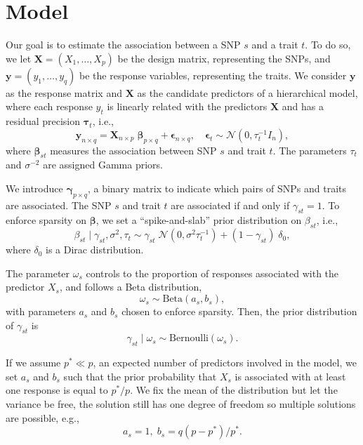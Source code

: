 \documentclass[a4paper, 11pt]{report}
\numberwithin{equation}{chapter}
\begin{document}
\chapter{Model}
Our goal is to estimate the association between a SNP $s$ and a trait $t$. To do so, we let $\boldsymbol{X }= (X_1,\ldots,X_p)$ be the design matrix, representing the SNPs, and $\boldsymbol{y} = (y_1,\ldots,y_q)$ be the response variables, representing the traits. We consider $\boldsymbol{y}$ as the response matrix and $\boldsymbol{X}$ as the candidate predictors of a hierarchical model, where each response $y_t$ is linearly related with the predictors $\boldsymbol{X}$ and has a residual precision $\boldsymbol{\tau}_t$, i.e.,
\begin{equation*}
\label{eq:model}
\boldsymbol{y}_{n\times q} = \boldsymbol{X}_{n \times p}\;\boldsymbol{\beta}_{p \times q}+\boldsymbol{\epsilon}_{n \times q},\quad\boldsymbol{\epsilon}_t \sim \mathcal{N}(0,\tau_t^{-1}I_n),
\end{equation*}
where $\boldsymbol{\beta}_{st}$ measures the association between SNP $s$ and trait $t$. The parameters $\tau_t$ and $\sigma^{-2}$ are assigned Gamma priors.

We introduce $\boldsymbol{\gamma}_{p\times q}$, a binary matrix to indicate which pairs of SNPs and traits are associated. The SNP $s$ and trait $t$ are associated if and only if $\gamma_{st} = 1$. To enforce sparsity on $\boldsymbol{\beta}$, we set a ``spike-and-slab'' prior distribution on $\beta_{st}$, i.e.,
\begin{equation*}
\beta_{st} \mid \gamma_{st},\sigma^2, \tau_t \sim \gamma_{st}\;\mathcal{N}(0,\sigma^2\tau_t^{-1})+(1-\gamma_{st})\;\delta_0,
\end{equation*}
where $\delta_0$ is a Dirac distribution.

The parameter $\omega_s$ controls to the proportion of responses associated with the predictor $X_s$, and follows a Beta distribution,
\begin{equation*}
\omega_s \sim \text{Beta}(a_s, b_s),
\end{equation*}
with parameters $a_s$ and $b_s$ chosen to enforce sparsity. Then, the prior distribution of $\gamma_{st}$ is
\begin{equation*}
\gamma_{st} \mid \omega_s \sim  \text{Bernoulli}(\omega_s).
\end{equation*}

If we assume $p^* \ll p$, an expected number of predictors involved in the model, we set $a_s$ and $b_s$ such that the prior probability that $X_s$ is associated with at least one response is equal to $p^*/p$. We fix the mean of the distribution but let the variance be free, the solution still has one degree of freedom so multiple solutions are possible, e.g.,
\begin{equation*}
a_s = 1,\;b_s = q(p-p^*)/p^*.
\end{equation*}
\end{document}

